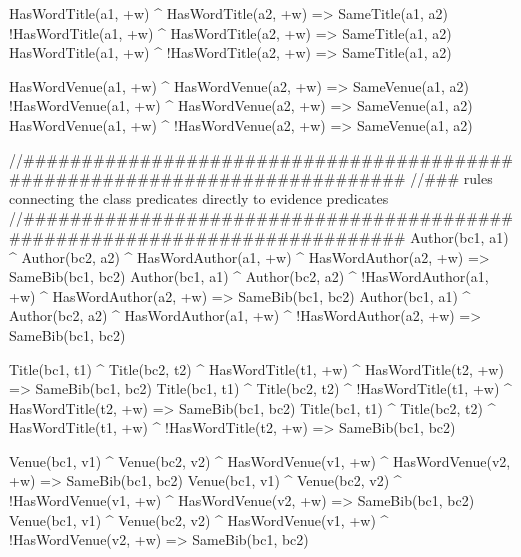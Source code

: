 HasWordTitle(a1, +w) ^ HasWordTitle(a2, +w) => SameTitle(a1, a2)
!HasWordTitle(a1, +w) ^ HasWordTitle(a2, +w) => SameTitle(a1, a2)
HasWordTitle(a1, +w) ^ !HasWordTitle(a2, +w) => SameTitle(a1, a2)

HasWordVenue(a1, +w) ^ HasWordVenue(a2, +w) => SameVenue(a1, a2)
!HasWordVenue(a1, +w) ^ HasWordVenue(a2, +w) => SameVenue(a1, a2)
HasWordVenue(a1, +w) ^ !HasWordVenue(a2, +w) => SameVenue(a1, a2)


//############################################################################ 
//### rules connecting the class predicates directly to evidence predicates 
//############################################################################ 
Author(bc1, a1) ^ Author(bc2, a2) ^ HasWordAuthor(a1, +w) ^ HasWordAuthor(a2, +w) => SameBib(bc1, bc2)
Author(bc1, a1) ^ Author(bc2, a2) ^ !HasWordAuthor(a1, +w) ^ HasWordAuthor(a2, +w) => SameBib(bc1, bc2)
Author(bc1, a1) ^ Author(bc2, a2) ^ HasWordAuthor(a1, +w) ^ !HasWordAuthor(a2, +w) => SameBib(bc1, bc2)

Title(bc1, t1) ^ Title(bc2, t2) ^ HasWordTitle(t1, +w) ^ HasWordTitle(t2, +w) => SameBib(bc1, bc2)
Title(bc1, t1) ^ Title(bc2, t2) ^ !HasWordTitle(t1, +w) ^ HasWordTitle(t2, +w) => SameBib(bc1, bc2)
Title(bc1, t1) ^ Title(bc2, t2) ^ HasWordTitle(t1, +w) ^ !HasWordTitle(t2, +w) => SameBib(bc1, bc2)

Venue(bc1, v1) ^ Venue(bc2, v2) ^ HasWordVenue(v1, +w) ^ HasWordVenue(v2, +w) => SameBib(bc1, bc2)
Venue(bc1, v1) ^ Venue(bc2, v2) ^ !HasWordVenue(v1, +w) ^ HasWordVenue(v2, +w) => SameBib(bc1, bc2)
Venue(bc1, v1) ^ Venue(bc2, v2) ^ HasWordVenue(v1, +w) ^ !HasWordVenue(v2, +w) => SameBib(bc1, bc2)

